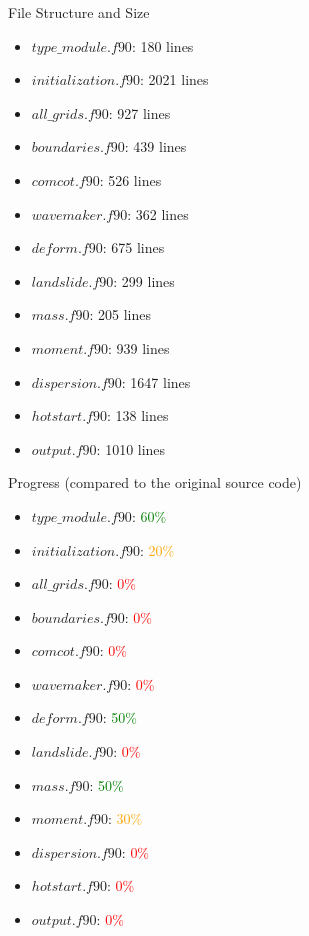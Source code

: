 \documentclass{beamer}
\begin{document}
\begin{frame}{File Structure and Size}
    \begin{itemize}
        \item $type\_module.f90$: 180 lines
        \item $initialization.f90$: 2021 lines
        \item $all\_grids.f90$: 927 lines
        \item $boundaries.f90$: 439 lines
        \item $comcot.f90$: 526 lines
        \item $wavemaker.f90$: 362 lines
        \item $deform.f90$: 675 lines
        \item $landslide.f90$: 299 lines
        \item $mass.f90$: 205 lines
        \item $moment.f90$: 939 lines
        \item $dispersion.f90$: 1647 lines
        \item $hotstart.f90$: 138 lines
        \item $output.f90$: 1010 lines
    \end{itemize}
\end{frame}

\begin{frame}{Progress (compared to the original source code)}
    \begin{itemize}
        \item $type\_module.f90$: \textcolor{green}{60\%}
        \item $initialization.f90$: \textcolor{orange}{20\%}
        \item $all\_grids.f90$: \textcolor{red}{0\%}
        \item $boundaries.f90$: \textcolor{red}{0\%}
        \item $comcot.f90$: \textcolor{red}{0\%}
        \item $wavemaker.f90$: \textcolor{red}{0\%}
        \item $deform.f90$: \textcolor{green}{50\%}
        \item $landslide.f90$: \textcolor{red}{0\%}
        \item $mass.f90$: \textcolor{green}{50\%}
        \item $moment.f90$: \textcolor{orange}{30\%}
        \item $dispersion.f90$: \textcolor{red}{0\%}
        \item $hotstart.f90$: \textcolor{red}{0\%}
        \item $output.f90$: \textcolor{red}{0\%}
    \end{itemize}
\end{frame}
\end{document}
